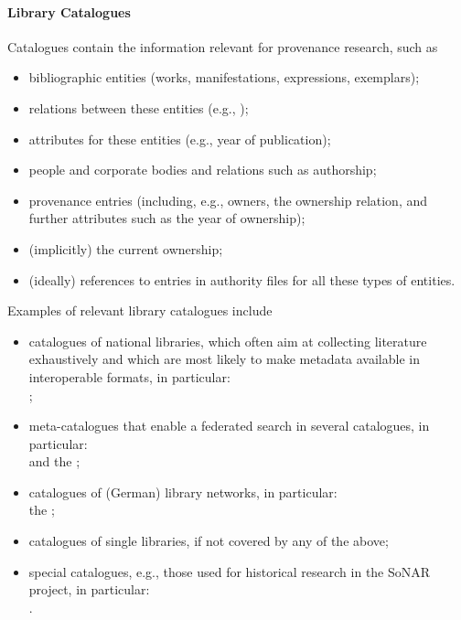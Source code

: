 \paragraph{Library Catalogues}
%
Catalogues contain the information relevant for provenance research, such as
%
\begin{itemize}
  \item
    bibliographic entities (works, manifestations, expressions, exemplars);
  \item
    relations between these entities (e.g., );
  \item
    attributes for these entities (e.g., year of publication);
  \item
    people and corporate bodies and relations such as authorship;
  \item
    provenance entries (including, e.g., owners, the ownership relation, and further attributes such as the year of ownership);
  \item
    (implicitly) the current ownership;
  \item
    (ideally) references to entries in authority files for all these types of entities.
\end{itemize}
%
Examples of relevant library catalogues include
%
\begin{itemize}
  \item
    catalogues of national libraries, which often aim at collecting literature exhaustively
    and which are most likely to make metadata available in interoperable formats,
    in particular: \\
     \autocite{DNBCatalogue,LoCcatalogue,BLcatalogue};
  \item
    meta-catalogues that enable a federated search in several catalogues,
    in particular: \\
     and the  \autocite{WorldCat,KVK};
  \item
    catalogues of (German) library networks,
    in particular: \\
    the  \autocite{K10plus,B3KAT,hbz,hebis};
  \item
    catalogues of single libraries, if not covered by any of the above;
  \item
    special catalogues, e.g., those used for historical research in the \gls{SoNAR} project, %
    in particular: \\
     \autocite{ZDB,KPE,ZEFYS,ExilePress}.
\end{itemize}

